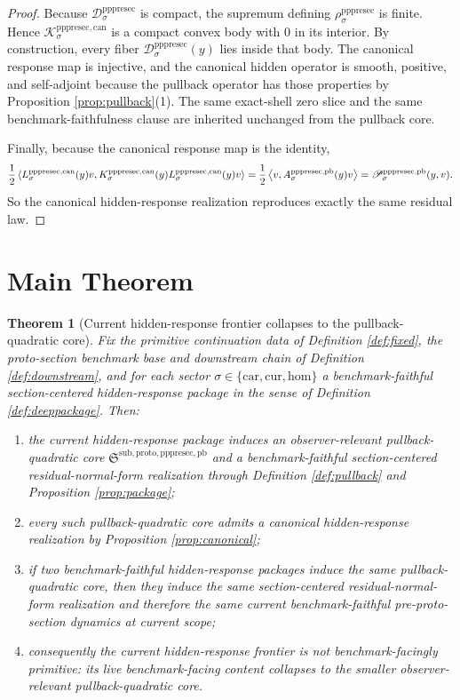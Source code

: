 \documentclass[11pt]{article}
\newcommand{\Car}{\mathrm{car}}
\newcommand{\Cur}{\mathrm{cur}}
\newcommand{\Hom}{\mathrm{hom}}
\newcommand{\PrePreProtoSectionResidualBody}[1]{\mathcal D_{#1}^{\mathrm{pppresec}}}
\newcommand{\PrePreProtoSectionPullbackCore}{\mathfrak S^{\mathrm{sub,proto,pppresec,pb}}}
\newcommand{\PrePreProtoSectionPullbackOperator}[1]{A_{#1}^{\mathrm{pppresec,pb}}}
\newcommand{\PrePreProtoSectionPullbackFunctional}[1]{\mathscr P_{#1}^{\mathrm{pppresec,pb}}}
\newcommand{\CanonicalHiddenBody}[1]{\mathcal K_{#1}^{\mathrm{pppresec,can}}}
\newcommand{\CanonicalResponseMap}[1]{L_{#1}^{\mathrm{pppresec,can}}}
\newcommand{\CanonicalHiddenOperator}[1]{K_{#1}^{\mathrm{pppresec,can}}}
\newcommand{\CanonicalHiddenRadius}[1]{\rho_{#1}^{\mathrm{pppresec}}}
\newtheorem{theorem}{Theorem}
\begin{document}
\begin{proof}
Because \(\PrePreProtoSectionResidualBody{\sigma}\) is compact, the supremum defining \(\CanonicalHiddenRadius{\sigma}\) is finite. Hence \(\CanonicalHiddenBody{\sigma}\) is a compact convex body with \(0\) in its interior. By construction, every fiber \(\PrePreProtoSectionResidualBody{\sigma}(y)\) lies inside that body. The canonical response map is injective, and the canonical hidden operator is smooth, positive, and self-adjoint because the pullback operator has those properties by Proposition \ref{prop:pullback}(1). The same exact-shell zero slice and the same benchmark-faithfulness clause are inherited unchanged from the pullback core.

Finally, because the canonical response map is the identity,
\[
\frac{1}{2}
\ev{
\CanonicalResponseMap{\sigma}(y)v,
\CanonicalHiddenOperator{\sigma}(y)
\CanonicalResponseMap{\sigma}(y)v
}
=
\frac{1}{2}
\ev{v,\PrePreProtoSectionPullbackOperator{\sigma}(y)v}
=
\PrePreProtoSectionPullbackFunctional{\sigma}(y,v).
\]
So the canonical hidden-response realization reproduces exactly the same residual law.
\end{proof}

\section{Main Theorem}

\begin{theorem}[Current hidden-response frontier collapses to the pullback-quadratic core]
\label{thm:main}
Fix the primitive continuation data of Definition \ref{def:fixed}, the proto-section benchmark base and downstream chain of Definition \ref{def:downstream}, and for each sector \(\sigma\in\{\Car,\Cur,\Hom\}\) a benchmark-faithful section-centered hidden-response package in the sense of Definition \ref{def:deeppackage}. Then:
\begin{enumerate}
    \item the current hidden-response package induces an observer-relevant pullback-quadratic core \(\PrePreProtoSectionPullbackCore\) and a benchmark-faithful section-centered residual-normal-form realization through Definition \ref{def:pullback} and Proposition \ref{prop:package};
    \item every such pullback-quadratic core admits a canonical hidden-response realization by Proposition \ref{prop:canonical};
    \item if two benchmark-faithful hidden-response packages induce the same pullback-quadratic core, then they induce the same section-centered residual-normal-form realization and therefore the same current benchmark-faithful pre-proto-section dynamics at current scope;
    \item consequently the current hidden-response frontier is not benchmark-facingly primitive: its live benchmark-facing content collapses to the smaller observer-relevant pullback-quadratic core.
\end{enumerate}
\end{theorem}
\end{document}
